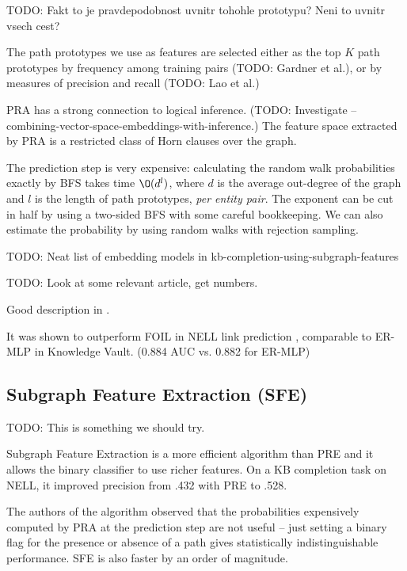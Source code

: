 TODO: Fakt to je pravdepodobnost uvnitr tohohle prototypu? Neni to uvnitr vsech
cest?

The path prototypes we use as features are selected either as the top $K$ path
prototypes by frequency among training pairs (TODO: Gardner et al.), or by
measures of precision and recall (TODO: Lao et al.)

PRA has a strong connection to logical inference. (TODO: Investigate --
combining-vector-space-embeddings-with-inference.)
The feature space extracted by PRA is a restricted class of Horn clauses over
the graph.\cite{subgraph-feature-extraction}

The prediction step is very expensive: calculating the random walk
probabilities exactly by BFS takes time $\O(d^l)$, where $d$ is the
average out-degree of the graph and $l$ is the length of path prototypes,
\textit{per entity pair}.
The exponent can be cut in half by using a two-sided BFS with some careful
bookkeeping. We can also estimate the probability by using random walks with
rejection sampling.

TODO: Neat list of embedding models in kb-completion-using-subgraph-features

TODO: Look at some relevant article, get numbers.

Good description in \cite{random-walk-inference}.

It was shown to outperform FOIL in NELL link prediction
\cite{review-of-relational-ml-for-kgs}, comparable to ER-MLP in Knowledge Vault.
(0.884 AUC vs. 0.882 for ER-MLP)

\subsection{Subgraph Feature Extraction (SFE)}

TODO: This is something we should try.

Subgraph Feature Extraction\cite{subgraph-feature-extraction} is a more
efficient algorithm than PRE and it allows the binary classifier to use richer
features. On a KB completion task on NELL, it improved precision from .432 with
PRE to .528.


The authors of the algorithm observed that the probabilities expensively
computed by PRA at the prediction step are not
useful\cite{subgraph-feature-extraction} -- just setting a binary flag for the
presence or absence of a path gives statistically indistinguishable performance.
SFE is also faster by an order of magnitude.

